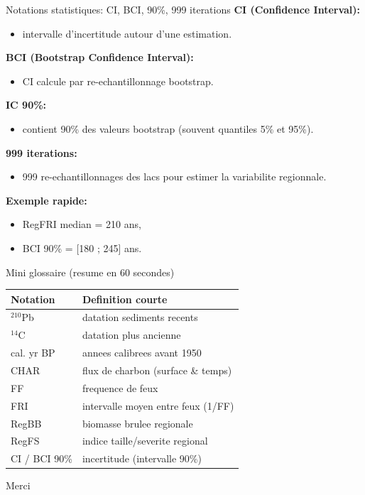\documentclass[aspectratio=169,11pt]{beamer}
\begin{document}
\begin{frame}{Notations statistiques: CI, BCI, 90\%, 999 iterations}
\textbf{CI (Confidence Interval):}
\begin{itemize}
  \item intervalle d'incertitude autour d'une estimation.
\end{itemize}

\textbf{BCI (Bootstrap Confidence Interval):}
\begin{itemize}
  \item CI calcule par re-echantillonnage bootstrap.
\end{itemize}

\textbf{IC 90\%:}
\begin{itemize}
  \item contient 90\% des valeurs bootstrap (souvent quantiles 5\% et 95\%).
\end{itemize}

\textbf{999 iterations:}
\begin{itemize}
  \item 999 re-echantillonnages des lacs pour estimer la variabilite regionnale.
\end{itemize}

\textbf{Exemple rapide:}
\begin{itemize}
  \item RegFRI median = 210 ans,
  \item BCI 90\% = [180 ; 245] ans.
\end{itemize}
\end{frame}

\begin{frame}{Mini glossaire (resume en 60 secondes)}
\small
\begin{tabular}{ll}
\toprule
\textbf{Notation} & \textbf{Definition courte} \\
\midrule
\(^{210}\)Pb & datation sediments recents \\
\(^{14}\)C & datation plus ancienne \\
cal. yr BP & annees calibrees avant 1950 \\
CHAR & flux de charbon (surface \& temps) \\
FF & frequence de feux \\
FRI & intervalle moyen entre feux (1/FF) \\
RegBB & biomasse brulee regionale \\
RegFS & indice taille/severite regional \\
CI / BCI 90\% & incertitude (intervalle 90\%) \\
\bottomrule
\end{tabular}
\end{frame}

\begin{frame}
\centering
\Huge Merci
\end{frame}
\end{document}

